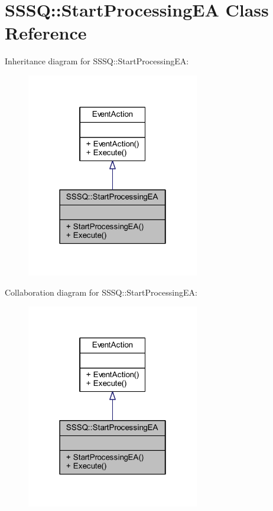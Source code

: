 \hypertarget{class_s_s_s_q_1_1_start_processing_e_a}{}\section{S\+S\+SQ\+:\+:Start\+Processing\+EA Class Reference}
\label{class_s_s_s_q_1_1_start_processing_e_a}


Inheritance diagram for S\+S\+SQ\+:\+:Start\+Processing\+EA\+:\nopagebreak
\begin{figure}[H]
\begin{center}
\leavevmode
\includegraphics[width=214pt]{class_s_s_s_q_1_1_start_processing_e_a__inherit__graph}
\end{center}
\end{figure}


Collaboration diagram for S\+S\+SQ\+:\+:Start\+Processing\+EA\+:\nopagebreak
\begin{figure}[H]
\begin{center}
\leavevmode
\includegraphics[width=214pt]{class_s_s_s_q_1_1_start_processing_e_a__coll__graph}
\end{center}
\end{figure}
